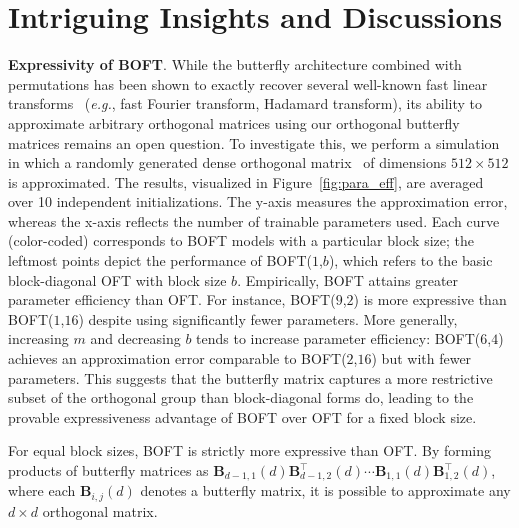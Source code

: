 \section{Intriguing Insights and Discussions}

\textbf{Expressivity of BOFT}. While the butterfly architecture combined with permutations has been shown to exactly recover several well-known fast linear transforms~\cite{dao2019learning,dao2019kaleidoscope} (\emph{e.g.}, fast Fourier transform, Hadamard transform), its ability to approximate arbitrary orthogonal matrices using our orthogonal butterfly matrices remains an open question. To investigate this, we perform a simulation in which a randomly generated dense orthogonal matrix~\cite{anderson1987generation} of dimensions $512\times 512$ is approximated. The results, visualized in Figure~\ref{fig:para_eff}, are averaged over 10 independent initializations. The y-axis measures the approximation error, whereas the x-axis reflects the number of trainable parameters used. Each curve (color-coded) corresponds to BOFT models with a particular block size; the leftmost points depict the performance of BOFT($1$,$b$), which refers to the basic block-diagonal OFT with block size $b$. Empirically, BOFT attains greater parameter efficiency than OFT. For instance, BOFT($9$,$2$) is more expressive than BOFT($1$,$16$) despite using significantly fewer parameters. More generally, increasing $m$ and decreasing $b$ tends to increase parameter efficiency: BOFT($6$,$4$) achieves an approximation error comparable to BOFT($2$,$16$) but with fewer parameters. This suggests that the butterfly matrix captures a more restrictive subset of the orthogonal group than block-diagonal forms do, leading to the provable expressiveness advantage of BOFT over OFT for a fixed block size.

\begin{theorem}\label{thm:exp_boft}
    For equal block sizes, BOFT is strictly more expressive than OFT. By forming products of butterfly matrices as $\bm{B}_{d-1,1}(d)\bm{B}^\top_{d-1,2}(d)\cdots\bm{B}_{1,1}(d)\bm{B}^\top_{1,2}(d)$, where each $\bm{B}_{i,j}(d)$ denotes a butterfly matrix, it is possible to approximate any $d\times d$ orthogonal matrix.
\end{theorem}

